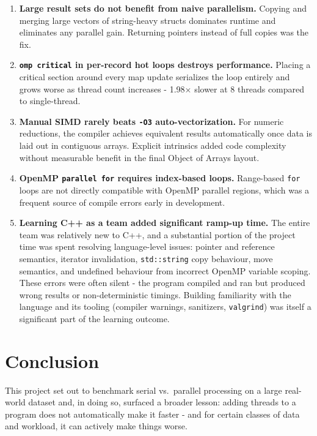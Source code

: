 \documentclass[12pt]{article}
\begin{document}
\begin{enumerate}
  \item \textbf{Large result sets do not benefit from naive parallelism.}
    Copying and merging large vectors of string-heavy structs dominates
    runtime and eliminates any parallel gain. Returning pointers instead
    of full copies was the fix.

  \item \textbf{\texttt{omp critical} in per-record hot loops destroys
    performance.}
    Placing a critical section around every map update serializes the loop
    entirely and grows worse as thread count increases -
    1.98$\times$ slower at 8 threads compared to single-thread.

  \item \textbf{Manual SIMD rarely beats \texttt{-O3} auto-vectorization.}
    For numeric reductions, the compiler achieves equivalent results
    automatically once data is laid out in contiguous arrays. Explicit
    intrinsics added code complexity without measurable benefit in the final
    Object of Arrays layout.

  \item \textbf{OpenMP \texttt{parallel for} requires index-based loops.}
    Range-based \texttt{for} loops are not directly compatible with OpenMP
    parallel regions, which was a frequent source of compile errors early in
    development.

  \item \textbf{Learning C++ as a team added significant ramp-up time.}
    The entire team was relatively new to C++, and a substantial portion of
    the project time was spent resolving language-level issues: pointer and
    reference semantics, iterator invalidation, \texttt{std::string} copy
    behaviour, move semantics, and undefined behaviour from incorrect OpenMP
    variable scoping. These errors were often silent - the program compiled
    and ran but produced wrong results or non-deterministic timings. Building
    familiarity with the language and its tooling (compiler warnings,
    sanitizers, \texttt{valgrind}) was itself a significant part of the
    learning outcome.

\end{enumerate}

\section{Conclusion}

This project set out to benchmark serial vs.\ parallel processing on a
large real-world dataset and, in doing so, surfaced a broader lesson: adding
threads to a program does not automatically make it faster - and for certain
classes of data and workload, it can actively make things worse.
\end{document}
